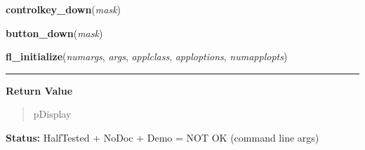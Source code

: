     \vspace{0.5ex}

\hspace{.8\funcindent}\begin{boxedminipage}{\funcwidth}

    \raggedright \textbf{controlkey\_down}(\textit{mask})

\setlength{\parskip}{2ex}
\setlength{\parskip}{1ex}
    \end{boxedminipage}

    \label{xformslib:library:button_down}

    \vspace{0.5ex}

\hspace{.8\funcindent}\begin{boxedminipage}{\funcwidth}

    \raggedright \textbf{button\_down}(\textit{mask})

\setlength{\parskip}{2ex}
\setlength{\parskip}{1ex}
    \end{boxedminipage}

    \label{xformslib:library:fl_initialize}

    \vspace{0.5ex}

\hspace{.8\funcindent}\begin{boxedminipage}{\funcwidth}

    \raggedright \textbf{fl\_initialize}(\textit{numargs}, \textit{args}, \textit{applclass}, \textit{apploptions}, \textit{numapplopts})

    \vspace{-1.5ex}

    \rule{\textwidth}{0.5\fboxrule}
\setlength{\parskip}{2ex}
\setlength{\parskip}{1ex}
      \textbf{Return Value}
    \vspace{-1ex}

      \begin{quote}
      pDisplay

      \end{quote}

\textbf{Status:} HalfTested + NoDoc + Demo = NOT OK (command line args)



    \end{boxedminipage}

